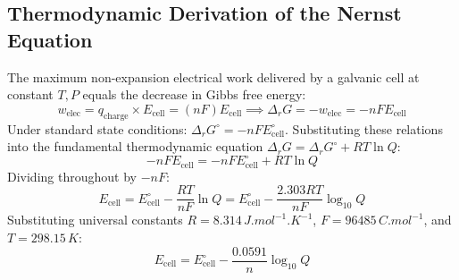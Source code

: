 \documentclass[10pt,a4paper]{article}
\begin{document}
\subsection{Thermodynamic Derivation of the Nernst Equation}
The maximum non-expansion electrical work delivered by a galvanic cell at constant $T, P$ equals the decrease in Gibbs free energy:
\begin{equation}
  w_{\text{elec}} = q_{\text{charge}} \times E_{\text{cell}} = (n F) E_{\text{cell}} \implies \Delta_r G = -w_{\text{elec}} = -n F E_{\text{cell}}
\end{equation}
Under standard state conditions: $\Delta_r G^\circ = -n F E_{\text{cell}}^\circ$.
Substituting these relations into the fundamental thermodynamic equation $\Delta_r G = \Delta_r G^\circ + R T \ln Q$:
\begin{equation}
  -n F E_{\text{cell}} = -n F E_{\text{cell}}^\circ + R T \ln Q
\end{equation}
Dividing throughout by $-n F$:
\begin{equation}
  E_{\text{cell}} = E_{\text{cell}}^\circ - \frac{R T}{n F}\ln Q = E_{\text{cell}}^\circ - \frac{2.303 R T}{n F}\log_{10} Q
\end{equation}
Substituting universal constants $R = 8.314\,\si{J.mol^{-1}.K^{-1}}$, $F = 96485\,\si{C.mol^{-1}}$, and $T = 298.15\,\si{K}$:
\begin{equation}
  E_{\text{cell}} = E_{\text{cell}}^\circ - \frac{0.0591}{n}\log_{10} Q
\end{equation}
\end{document}
